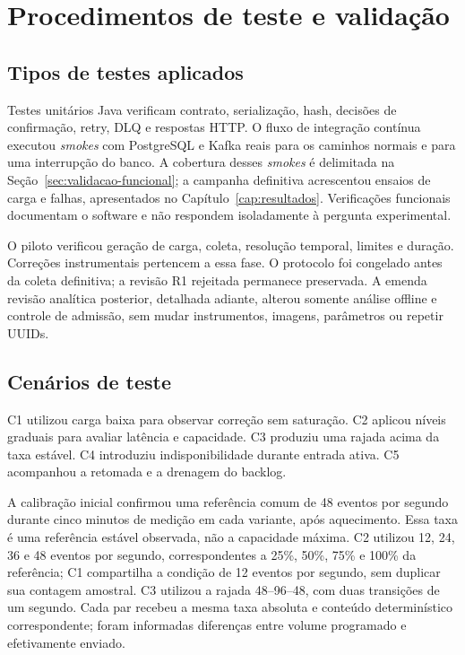 \section{Procedimentos de teste e validação}

\subsection{Tipos de testes aplicados}
Testes unitários Java verificam contrato, serialização, hash, decisões de confirmação, retry, DLQ e respostas HTTP. O fluxo de integração contínua executou \textit{smokes} com PostgreSQL e Kafka reais para os caminhos normais e para uma interrupção do banco. A cobertura desses \textit{smokes} é delimitada na Seção~\ref{sec:validacao-funcional}; a campanha definitiva acrescentou ensaios de carga e falhas, apresentados no Capítulo~\ref{cap:resultados}. Verificações funcionais documentam o software e não respondem isoladamente à pergunta experimental.

O piloto verificou geração de carga, coleta, resolução temporal, limites e duração. Correções instrumentais pertencem a essa fase. O protocolo foi congelado antes da coleta definitiva; a revisão R1 rejeitada permanece preservada. A emenda revisão analítica posterior, detalhada adiante, alterou somente análise offline e controle de admissão, sem mudar instrumentos, imagens, parâmetros ou repetir UUIDs.

\subsection{Cenários de teste}
C1 utilizou carga baixa para observar correção sem saturação. C2 aplicou níveis graduais para avaliar latência e capacidade. C3 produziu uma rajada acima da taxa estável. C4 introduziu indisponibilidade durante entrada ativa. C5 acompanhou a retomada e a drenagem do backlog.

A calibração inicial confirmou uma referência comum de 48 eventos por segundo durante cinco minutos de medição em cada variante, após aquecimento. Essa taxa é uma referência estável observada, não a capacidade máxima. C2 utilizou 12, 24, 36 e 48 eventos por segundo, correspondentes a 25\%, 50\%, 75\% e 100\% da referência; C1 compartilha a condição de 12 eventos por segundo, sem duplicar sua contagem amostral. C3 utilizou a rajada 48--96--48, com duas transições de um segundo. Cada par recebeu a mesma taxa absoluta e conteúdo determinístico correspondente; foram informadas diferenças entre volume programado e efetivamente enviado.

